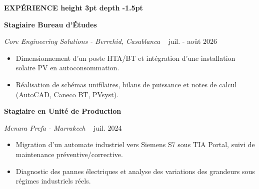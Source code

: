 \documentclass[10pt,a4paper]{altacv}
\renewcommand{\cvsection}[2][]{%
  \vspace{4pt}%
  {\color{heading}\Large\bfseries #2 \hspace{0.2em}\leaders\vrule height 3pt depth -1.5pt\hfill\mbox{}}\par\vspace{3pt}
}
\renewcommand{\cvevent}[4]{%
  {\normalsize\bfseries\color{accent}#1\par}\vspace{1pt}
  \ifstrequal{#2}{}{}{%
    {\small\itshape\color{emphasis}#2\ifstrequal{#4}{}{}{ - #4}}%
  }%
  ~\hfill
  \ifstrequal{#3}{}{}{{\small\color{emphasis}#3}}%
  \par\vspace{2pt}
}
\begin{document}
\cvsection{EXPÉRIENCE}
\cvevent{Stagiaire Bureau d’Études}{Core Engineering Solutions}{juil. - août 2026}{Berrchid, Casablanca}
\begin{itemize}[leftmargin=*, label=\textbullet, nosep, itemsep=1.5pt]
  \item Dimensionnement d’un poste HTA/BT et intégration d’une installation solaire PV en autoconsommation.
  \item Réalisation de schémas unifilaires, bilans de puissance et notes de calcul (AutoCAD, Caneco BT, PVsyst).
\end{itemize}
\vspace{2pt}
\cvevent{Stagiaire en Unité de Production}{Menara Prefa}{juil. 2024}{Marrakech}
\begin{itemize}[leftmargin=*, label=\textbullet, nosep, itemsep=1.5pt]
  \item Migration d’un automate industriel vers Siemens S7 sous TIA Portal, suivi de maintenance préventive/corrective.
  \item Diagnostic des pannes électriques et analyse des variations des grandeurs sous régimes industriels réels.
\end{itemize}
\end{document}
